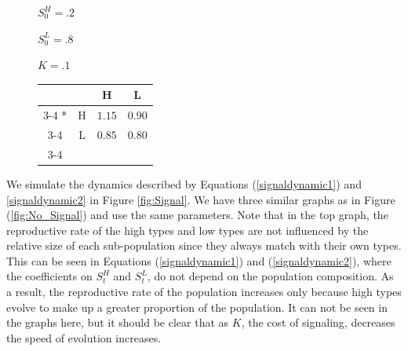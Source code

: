 \begin{figure}[p]
\begin{minipage}[c]{.2\textwidth}
    $S_0^H = .2$
    
    $S_0^L = .8$
    
    $K = .1$
    \end{minipage}\hfill
  \begin{minipage}[c]{.6\textwidth}
  \begin{tabular}{cc|c|c|}
      & \multicolumn{1}{c}{} & \multicolumn{1}{c}{H}  & \multicolumn{1}{c}{L} \\\cline{3-4}
      \multirow{2}*{}  & H & $1.15$ & $0.90$ \\\cline{3-4}
      & L & $0.85$ & $0.80$ \\\cline{3-4}
    \end{tabular}
    \end{minipage}
    \end{figure}

We simulate the dynamics described by Equations (\ref{signaldynamic1}) and \ref{signaldynamic2} in Figure \ref{fig:Signal}. We have three similar graphs as in Figure (\ref{fig:No_Signal}) and use the same parameters. Note that in the top graph, the reproductive rate of the high types and low types are not influenced by the relative size of each sub-population since they always match with their own types. This can be seen in Equations (\ref{signaldynamic1}) and (\ref{signaldynamic2}),  where the coefficients on $S^H_t$ and $S^L_t$, do not depend on the population composition. As a result, the reproductive rate of the population increases only because high types evolve to make up a greater proportion of the population. It can not be seen in the graphs here, but it should be clear that as $K$, the cost of signaling, decreases the speed of evolution increases. 




